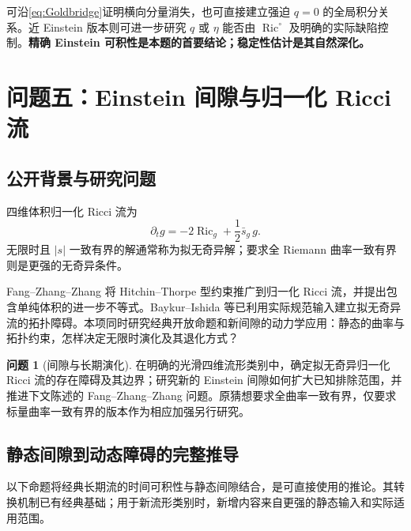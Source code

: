 \documentclass[11pt,a4paper]{article}
\newcommand{\Ric}{\operatorname{Ric}}
\theoremstyle{definition}
\newtheorem{problem}{问题}[section]
\numberwithin{equation}{section}
\begin{document}
可沿\eqref{eq:Goldbridge}证明横向分量消失，也可直接建立强迫 $q=0$ 的全局积分关系。近 Einstein 版本则可进一步研究 $q$ 或 $\eta$ 能否由 $\Ric^\circ$ 及明确的实际缺陷控制。\textbf{精确 Einstein 可积性是本题的首要结论；稳定性估计是其自然深化。}

\section{问题五：Einstein 间隙与归一化 Ricci 流}
\label{sec:flow}

\subsection{公开背景与研究问题}
四维体积归一化 Ricci 流为
\begin{equation}
\partial_tg=-2\Ric_g+\frac12\bar s_g\,g.\label{eq:flow}
\end{equation}
无限时且 $|s|$ 一致有界的解通常称为拟无奇异解；要求全 Riemann 曲率一致有界则是更强的无奇异条件。

Fang--Zhang--Zhang 将 Hitchin--Thorpe 型约束推广到归一化 Ricci 流，并提出包含单纯体积的进一步不等式\cite{FZZ}。Baykur--Ishida 等已利用实际规范输入建立拟无奇异流的拓扑障碍\cite{BaykurIshida,Ishida}。本项同时研究经典开放命题和新间隙的动力学应用：静态的曲率与拓扑约束，怎样决定无限时演化及其退化方式？

\begin{problem}[间隙与长期演化]
在明确的光滑四维流形类别中，确定拟无奇异归一化 Ricci 流的存在障碍及其边界；研究新的 Einstein 间隙如何扩大已知排除范围，并推进下文陈述的 Fang--Zhang--Zhang 问题。原猜想要求全曲率一致有界，仅要求标量曲率一致有界的版本作为相应加强另行研究。
\end{problem}

\subsection{静态间隙到动态障碍的完整推导}
以下命题将经典长期流的时间可积性与静态间隙结合，是可直接使用的推论。其转换机制已有经典基础；用于新流形类别时，新增内容来自更强的静态输入和实际适用范围。
\end{document}
